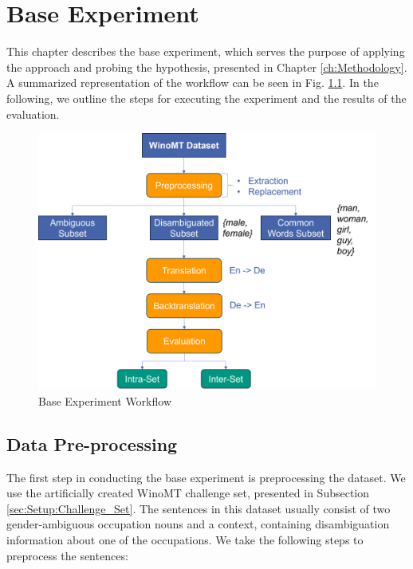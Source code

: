 \chapter{Base Experiment}
\label{ch:Base_Experiment}

This chapter describes the base experiment, which serves the purpose of applying the approach and probing the hypothesis, presented in Chapter \ref{ch:Methodology}. A summarized representation of the workflow can be seen in Fig. \ref{fig:base_workflow}. In the following, we outline the steps for executing the experiment and the results of the evaluation. \\

\begin{figure}[!htb]
  \centering
  \includegraphics[scale=0.55]{figures/base_workflow.png}
  \caption{Base Experiment Workflow}
  \label{fig:base_workflow}
\end{figure}

\section{Data Pre-processing}
\label{sec:Base_Experiment:Pre-processing}
The first step in conducting the base experiment is preprocessing the dataset. We use the artificially created WinoMT challenge set, presented in Subsection \ref{sec:Setup:Challenge_Set}. The sentences in this dataset usually consist of two gender-ambiguous occupation nouns and a context, containing disambiguation information about one of the occupations. We take the following steps to preprocess the sentences:


